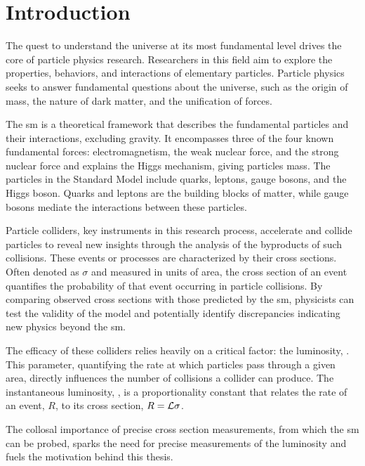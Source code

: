 \chapter{Introduction}


The quest to understand the universe at its most fundamental level drives the core of particle physics research. Researchers in this field aim to explore the properties, behaviors, and interactions of elementary particles. Particle physics seeks to answer fundamental questions about the universe, such as the origin of mass, the nature of dark matter, and the unification of forces.

The \acrlong{sm} is a theoretical framework that describes the fundamental particles and their interactions, excluding gravity. It encompasses three of the four known fundamental forces: electromagnetism, the weak nuclear force, and the strong nuclear force and explains the Higgs mechanism, giving particles mass. The particles in the Standard Model include quarks, leptons, gauge bosons, and the Higgs boson. Quarks and leptons are the building blocks of matter, while gauge bosons mediate the interactions between these particles.

Particle colliders, key instruments in this research process, accelerate and collide particles to reveal new insights through the analysis of the byproducts of such collisions. These events or processes are characterized by their cross sections. Often denoted as $\sigma$ and measured in units of area, the cross section of an event quantifies the probability of that event occurring in particle collisions. By comparing observed cross sections with those predicted by the \acrshort{sm}, physicists can test the validity of the model and potentially identify discrepancies indicating new physics beyond the \acrlong{sm}.

The efficacy of these colliders relies heavily on a critical factor: the luminosity, \Ilum. This parameter, quantifying the rate at which particles pass through a given area, directly influences the number of collisions a collider can produce. The instantaneous luminosity, \ilum, is a proportionality constant that relates the rate of an event, $R$, to its cross section, $R = \mathcal{L} \sigma$.

The collosal importance of precise cross section measurements, from which the \acrshort{sm} can be probed, sparks the need for precise measurements of the luminosity and fuels the motivation behind this thesis.